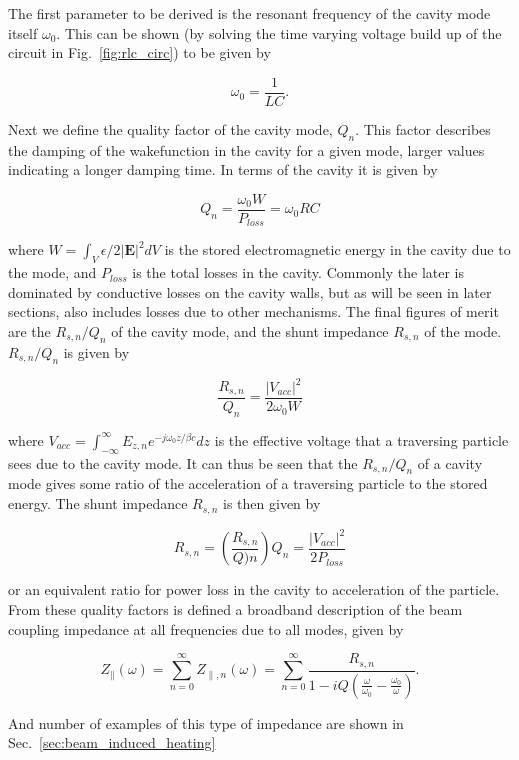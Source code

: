 The first parameter to be derived is the resonant frequency of the cavity mode itself $\omega_{0}$. This can be shown (by solving the time varying voltage build up of the circuit in Fig.~\ref{fig:rlc_circ}) to be given by

\begin{equation}
\omega_{0} = \frac{1}{LC}.
\end{equation}

Next we define the quality factor of the cavity mode, $Q_{n}$. This factor describes the damping of the wakefunction in the cavity for a given mode, larger values indicating a longer damping time. In terms of the cavity it is given by

\begin{equation}
Q_{n} = \frac{\omega_{0} W}{P_{loss}} = \omega_{0}RC
\end{equation}

where $W = \int_{V} \epsilon / 2 \left| \mathbf{E} \right|^{2} dV$ is the stored electromagnetic energy in the cavity due to the mode, and $P_{loss}$ is the total losses in the cavity. Commonly the later is dominated by conductive losses on the cavity walls, but as will be seen in later sections, also includes losses due to other mechanisms. The final figures of merit are the $R_{s, n}/Q_{n}$ of the cavity mode, and the shunt impedance $R_{s, n}$ of the mode. $R_{s, n}/Q_{n}$ is given by

\begin{equation}
\frac{R_{s, n}}{Q_{n}} = \frac{\left| V_{acc} \right|^{2}}{2 \omega_{0} W}
\end{equation}

where $V_{acc} = \int^{\infty}_{-\infty} E_{z, n} e^{-j \omega_{0} z/ \beta{}c} dz$ is the effective voltage that a traversing particle sees due to the cavity mode. It can thus be seen that the $R_{s, n}/Q_{n}$ of a cavity mode gives some ratio of the acceleration of a traversing particle to the stored energy. The shunt impedance $R_{s, n}$ is then given by

\begin{equation}
R_{s, n} = \left(  \frac{R_{s, n}}{Q){n}} \right) Q_{n} = \frac{\left| V_{acc} \right|^{2}}{2 P_{loss}}
\end{equation}

or an equivalent ratio for power loss in the cavity to acceleration of the particle. From these quality factors is defined a broadband description of the beam coupling impedance at all frequencies due to all modes, given by

\begin{equation}
Z_{\parallel} \left( \omega \right) = \displaystyle\sum\limits_{n = 0}^{\infty} Z_{\parallel, n} \left( \omega \right) = \displaystyle\sum\limits_{n = 0}^{\infty} \frac{R_{s, n}}{1 - iQ \left( \frac{\omega}{\omega_{0}} - \frac{\omega_{0}}{\omega} \right)}.
\end{equation}

And number of examples of this type of impedance are shown in Sec.~\ref{sec:beam_induced_heating}